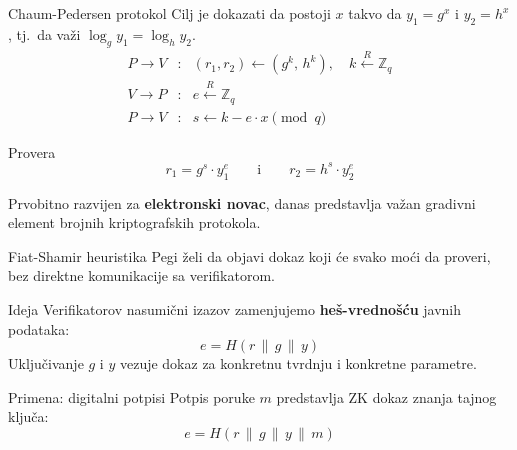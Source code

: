 ﻿\documentclass[aspectratio=1610]{beamer}
\newcommand{\keyword}[1]{\textcolor{wcprimary}{\textbf{#1}}}
\begin{document}
\begin{frame}{Chaum-Pedersen protokol}
\vspace{4pt}
Cilj je dokazati da postoji $x$ takvo da $y_1 = g^x$ i $y_2 = h^x$,
tj.\ da važi $\log_g y_1 = \log_h y_2$.
\vspace{8pt}
\[
  \begin{array}{rcl}
    P \to V & : & (r_1, r_2) \leftarrow (g^k,\, h^k), \quad k \xleftarrow{R} \mathbb{Z}_q \\[10pt]
    V \to P & : & e \xleftarrow{R} \mathbb{Z}_q \\[10pt]
    P \to V & : & s \leftarrow k - e \cdot x \pmod{q}
  \end{array}
\]
\vspace{6pt}
\begin{block}{\normalsize Provera}
  \[
    r_1 = g^s \cdot y_1^e \qquad \text{i} \qquad r_2 = h^s \cdot y_2^e
  \]
\end{block}
\vspace{6pt}
{\small Prvobitno razvijen za \keyword{elektronski novac}, danas predstavlja važan gradivni element brojnih kriptografskih protokola.}
\end{frame}

\begin{frame}{Fiat-Shamir heuristika}
\vspace{4pt}
{\small Pegi želi da objavi dokaz koji će svako moći da proveri, bez direktne komunikacije sa verifikatorom.}
\begin{block}{\normalsize Ideja}
  Verifikatorov nasumični izazov zamenjujemo \keyword{heš-vrednošću} javnih podataka:
  \[
    e = H(r \,\|\, g \,\|\, y)
  \]
  Uključivanje $g$ i $y$ vezuje dokaz za konkretnu tvrdnju i konkretne parametre.
\end{block}
\begin{exampleblock}{\normalsize Primena: digitalni potpisi}
  Potpis poruke $m$ predstavlja ZK dokaz znanja tajnog ključa:
  \[
    e = H(r \,\|\, g \,\|\, y \,\|\, m)
  \]
\end{exampleblock}
\end{frame}
\end{document}
